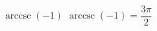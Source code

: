  {$\operatorname{arccsc} \left( -1 \right)$ }
{ $\operatorname{arccsc} \left( -1 \right) = \dfrac{3\pi}{2}$ }
